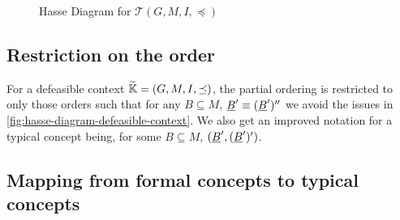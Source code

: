 \documentclass[11pt]{article}
\begin{document}
\begin{figure}[h]
  \begin{center}
  \end{center}
  \caption{Hasse Diagram for $\mathcal{T} (G,M,I, \preceq)$}
  \label{fig:hasse-diagram-defeasible-context}
\end{figure}

\subsection{Restriction on the order}

For a defeasible context $\widetilde{\mathbb{K}} = (G,M,I,\preceq)$, the partial ordering is restricted to only those orders such that for any $B \subseteq M$, $\underline{B}' \equiv (\underline{B}')''$ we avoid the issues in \autoref{fig:hasse-diagram-defeasible-context}. We also get an improved notation for a typical concept being, for some $B\subseteq M$, $(\underline{B}', (\underline{B}')')$.



\subsection{Mapping from formal concepts to typical concepts}



\end{document}
